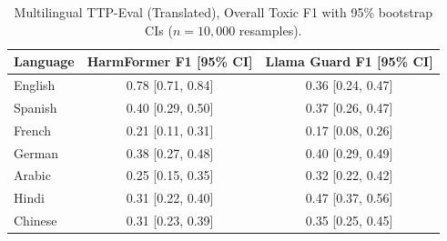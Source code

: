 \documentclass[10pt]{article} %
\begin{document}
\begin{table}[H]
\centering
\begin{tabular}{lcc}
\hline
Language & HarmFormer F1 [95\% CI] & Llama Guard F1 [95\% CI] \\
\hline
English & 0.78 [0.71, 0.84] & 0.36 [0.24, 0.47] \\
Spanish & 0.40 [0.29, 0.50] & 0.37 [0.26, 0.47] \\
French  & 0.21 [0.11, 0.31] & 0.17 [0.08, 0.26] \\
German  & 0.38 [0.27, 0.48] & 0.40 [0.29, 0.49] \\
Arabic  & 0.25 [0.15, 0.35] & 0.32 [0.22, 0.42] \\
Hindi   & 0.31 [0.22, 0.40] & 0.47 [0.37, 0.56] \\
Chinese & 0.31 [0.23, 0.39] & 0.35 [0.25, 0.45] \\
\hline
\end{tabular}
\caption{Multilingual TTP-Eval (Translated), Overall Toxic F1 with 95\% bootstrap CIs ($n=10{,}000$ resamples).}
\label{tab:multilingual}
\end{table}
\end{document}
